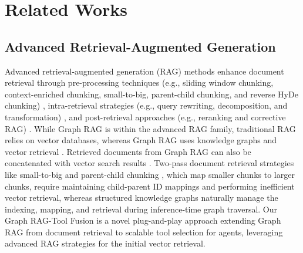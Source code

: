 \section{Related Works}
\subsection{Advanced Retrieval-Augmented Generation}
Advanced retrieval-augmented generation (RAG) methods enhance document retrieval through pre-processing techniques (e.g., sliding window chunking, context-enriched chunking, small-to-big, parent-child chunking, and reverse HyDe chunking) \cite{anthropic_contextual_2024,setty_improving_2024,yang_advanced_2023}, intra-retrieval strategies (e.g., query rewriting, decomposition, and transformation) \cite{ma_query_2023,tang_multihop-rag_2024,trivedi_interleaving_2023,yao_react_2023,khattab_demonstrate-search-predict_2023,joshi_reaper_2024,xu_rewoo_2023,zheng_take_2024}, and post-retrieval approaches (e.g., reranking and corrective RAG) \cite{raudaschl_forget_2023,asai_self-rag_2023,yan_corrective_2024,sun_is_2023}. While Graph RAG is within the advanced RAG family, traditional RAG relies on vector databases, whereas Graph RAG uses knowledge graphs and vector retrieval \cite{gao2024retrievalaugmentedgenerationlargelanguage}. Retrieved documents from Graph RAG can also be concatenated with vector search results \cite{sarmah2024hybridragintegratingknowledgegraphs,raudaschl_forget_2023}. Two-pass document retrieval strategies like small-to-big and parent-child chunking \cite{langchain_parent_document_retriever_2023}, which map smaller chunks to larger chunks, require maintaining child-parent ID mappings and performing inefficient vector retrieval, whereas structured knowledge graphs naturally manage the indexing, mapping, and retrieval during inference-time graph traversal. Our Graph RAG-Tool Fusion is a novel plug-and-play approach extending Graph RAG from document retrieval to scalable tool selection for agents, leveraging advanced RAG strategies for the initial vector retrieval.

